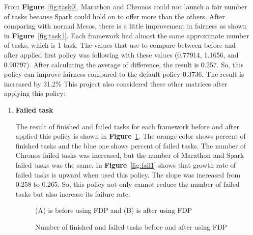 \documentclass[12pt,oneside,openright,a4paper]{cpe-english-project}
\begin{document}
\hspace{10mm}From \textbf{Figure}~\ref{fig:task0}, Marathon and Chronos could not launch a fair number of tasks because Spark could hold on to offer more than the others. After comparing with normal Mesos, there is a little improvement in fairness as shown in \textbf{Figure}~\ref{fig:task1}. Each framework had almost the same approximate number of tasks, which is 1 task. The values that use to compare between before and after applied first policy was following with these values (0.77914, 1.1656, and 0.90797). After calculating the average of difference, the result is 0.257. So, this policy can improve fairness compared to the default policy 0.3736. The result is increased by 31.2\%
\newline
This project also considered these other matrices after applying this policy: 
\begin{enumerate}

  \item \textbf{Failed task}

\hspace{10mm}The result of finished and failed tasks for each framework before and after applied this policy is shown in \textbf{Figure}~\ref{fig:finfail0-1}. The orange color shows percent of finished tasks and the blue one shows percent of failed tasks. The number of Chronos failed tasks was increased, but the number of Marathon and Spark failed tasks was the same. In \textbf{Figure}~\ref{fig:fail1} shows that growth rate of failed tasks is upward when used this policy. The slope was increased from 0.258 to 0.265. So, this policy not only cannot reduce the number of failed tasks but also increase its failure rate.

  \begin{figure}[!h]\centering
    \setlength{\fboxrule}{0mm} %
    \setlength{\fboxsep}{0cm}
    \caption{Number of finished and failed tasks before and after using FDP}\label{fig:finfail0-1}
    (A) is before using FDP and (B) is  after using FDP
\end{figure}


\end{enumerate}
\end{document}

